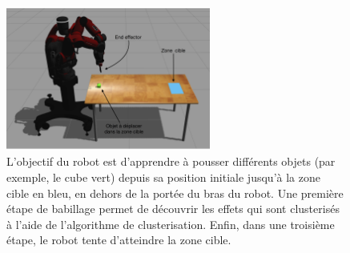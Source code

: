 \documentclass[draft]{llncs}
\begin{document}

\begin{figure}[ht]
  \begin{center}
    \includegraphics[width=0.6\textwidth]{figures/Experiment_setup_annoted_FR.png}
    \caption{L'objectif du robot est d'apprendre à pousser différents objets (par exemple, le cube vert) depuis sa position initiale jusqu'à la zone cible en bleu, en dehors de la portée du bras du robot. Une première étape de babillage permet de découvrir les effets qui sont clusterisés à l'aide de l'algorithme de clusterisation. Enfin, dans une troisième étape, le robot tente d'atteindre la zone cible.}
    \label{fig:setup}
  \end{center}
\end{figure}
\end{document}
